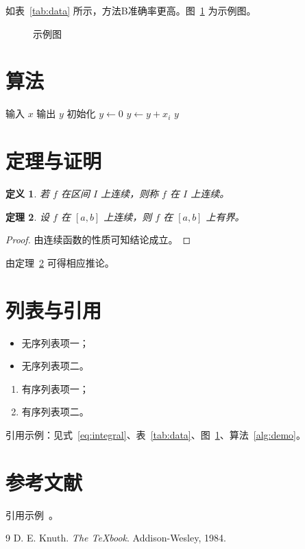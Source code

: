 \documentclass{ctexart}
\newtheorem{theorem}{定理}[section]
\newtheorem{definition}[theorem]{定义}
\begin{document}
如表~\ref{tab:data} 所示，方法B准确率更高。图~\ref{fig:demo} 为示例图。

\begin{figure}[htbp]
\centering
\fbox{\rule{0pt}{3cm}\rule{6cm}{0pt}}
\caption{示例图}
\label{fig:demo}
\end{figure}

\section{算法}
\begin{algorithm}[htbp]
\caption{示例算法}
\label{alg:demo}
\begin{algorithmic}[1]
\Require 输入 $x$
\Ensure 输出 $y$
\State 初始化 $y \gets 0$
    \State $y \gets y + x_i$
\EndFor
\State \Return $y$
\end{algorithmic}
\end{algorithm}

\section{定理与证明}
\begin{definition}
若 $f$ 在区间 $I$ 上连续，则称 $f$ 在 $I$ 上连续。
\end{definition}

\begin{theorem}
\label{thm:main}
设 $f$ 在 $[a,b]$ 上连续，则 $f$ 在 $[a,b]$ 上有界。
\end{theorem}

\begin{proof}
由连续函数的性质可知结论成立。
\end{proof}

由定理~\ref{thm:main} 可得相应推论。

\section{列表与引用}
\begin{itemize}
    \item 无序列表项一；
    \item 无序列表项二。
\end{itemize}

\begin{enumerate}
    \item 有序列表项一；
    \item 有序列表项二。
\end{enumerate}

引用示例：见式~\eqref{eq:integral}、表~\ref{tab:data}、图~\ref{fig:demo}、算法~\ref{alg:demo}。

\section{参考文献}
引用示例~\cite{knuth1984}。

\begin{thebibliography}{9}
D. E. Knuth. \emph{The \TeX book}. Addison-Wesley, 1984.
\end{thebibliography}
\end{document}
